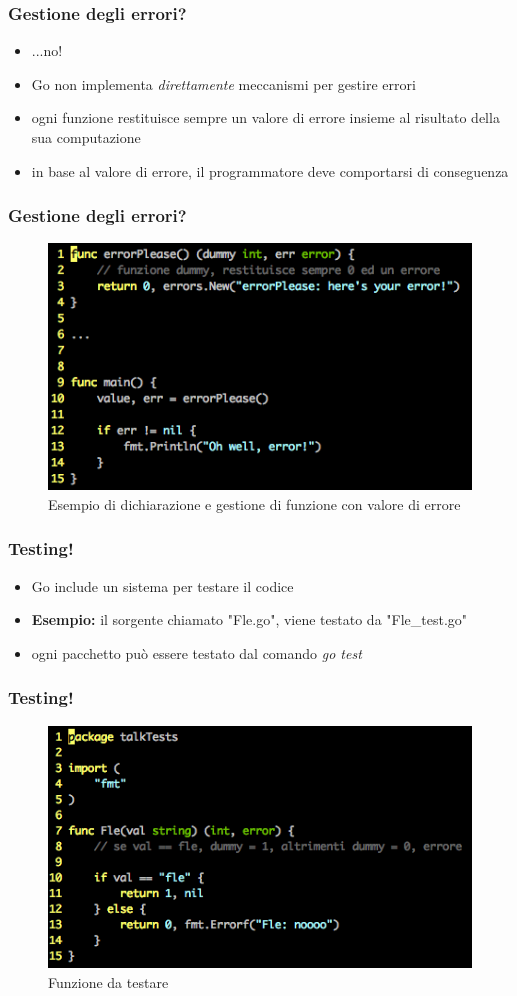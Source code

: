 \documentclass[12pt]{beamer}
\begin{document}
	\begin{frame}
		\frametitle{Gestione degli errori?}
		\begin{itemize}[<+->]
			\item ...no!
			\item Go non implementa \textit{direttamente} meccanismi per gestire errori
			\item ogni funzione restituisce sempre un valore di errore insieme al risultato della sua computazione
			\item in base al valore di errore, il programmatore deve comportarsi di conseguenza
		\end{itemize}
	\end{frame}
	
	\begin{frame}
		\frametitle{Gestione degli errori?}
		\begin{figure}
			\centering
			\includegraphics[width=0.7\linewidth]{funcerror}
			\caption[Errore]{Esempio di dichiarazione e gestione di funzione con valore di errore}
			\label{fig:funcerror}
		\end{figure}
	\end{frame}
	
	\begin{frame}
		\frametitle{Testing!}
		\begin{itemize}[<+->]
			\item Go include un sistema per testare il codice
			\item \textbf{Esempio:} il sorgente chiamato "Fle.go", viene testato da "Fle\_test.go"
			\item ogni pacchetto può essere testato dal comando \textit{go test}
		\end{itemize}
	\end{frame}
	
	\begin{frame}
		\frametitle{Testing!}
		\begin{figure}
			\centering
			\includegraphics[width=0.7\linewidth]{testfunc}
			\caption[Funzione test]{Funzione da testare}
			\label{fig:testfunc}
		\end{figure}
	\end{frame}
	
\end{document}
